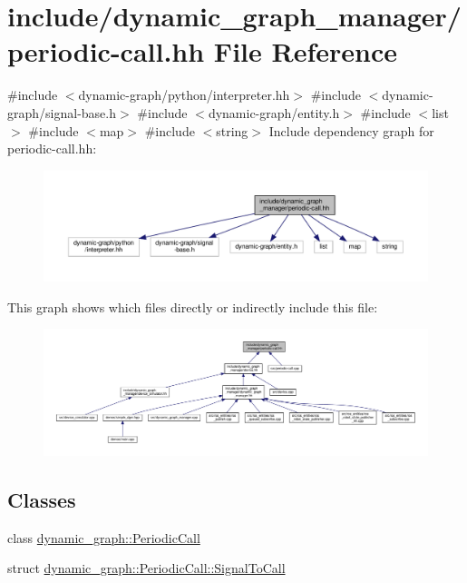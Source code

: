 \hypertarget{periodic-call_8hh}{}\section{include/dynamic\+\_\+graph\+\_\+manager/periodic-\/call.hh File Reference}
\label{periodic-call_8hh}
{\ttfamily \#include $<$dynamic-\/graph/python/interpreter.\+hh$>$}\newline
{\ttfamily \#include $<$dynamic-\/graph/signal-\/base.\+h$>$}\newline
{\ttfamily \#include $<$dynamic-\/graph/entity.\+h$>$}\newline
{\ttfamily \#include $<$list$>$}\newline
{\ttfamily \#include $<$map$>$}\newline
{\ttfamily \#include $<$string$>$}\newline
Include dependency graph for periodic-\/call.hh\+:
\nopagebreak
\begin{figure}[H]
\begin{center}
\leavevmode
\includegraphics[width=350pt]{periodic-call_8hh__incl}
\end{center}
\end{figure}
This graph shows which files directly or indirectly include this file\+:
\nopagebreak
\begin{figure}[H]
\begin{center}
\leavevmode
\includegraphics[width=350pt]{periodic-call_8hh__dep__incl}
\end{center}
\end{figure}
\subsection*{Classes}
\begin{DoxyCompactItemize}
\item 
class \hyperlink{classdynamic__graph_1_1PeriodicCall}{dynamic\+\_\+graph\+::\+Periodic\+Call}
\item 
struct \hyperlink{structdynamic__graph_1_1PeriodicCall_1_1SignalToCall}{dynamic\+\_\+graph\+::\+Periodic\+Call\+::\+Signal\+To\+Call}
\end{DoxyCompactItemize}
